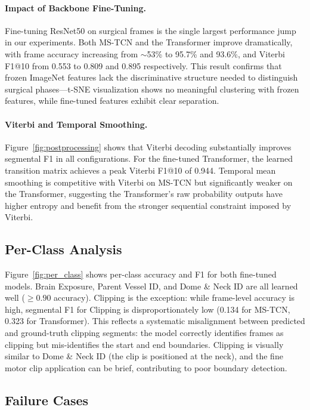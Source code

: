 \documentclass[10pt,twocolumn]{article}
\begin{document}
\paragraph{Impact of Backbone Fine-Tuning.} Fine-tuning ResNet50 on surgical frames is the single largest performance jump in our experiments. Both MS-TCN and the Transformer improve dramatically, with frame accuracy increasing from $\sim$53\% to 95.7\% and 93.6\%, and Viterbi F1@10 from 0.553 to 0.809 and 0.895 respectively. This result confirms that frozen ImageNet features lack the discriminative structure needed to distinguish surgical phases—t-SNE visualization shows no meaningful clustering with frozen features, while fine-tuned features exhibit clear separation.

\paragraph{Viterbi and Temporal Smoothing.} Figure~\ref{fig:postprocessing} shows that Viterbi decoding substantially improves segmental F1 in all configurations. For the fine-tuned Transformer, the learned transition matrix achieves a peak Viterbi F1@10 of 0.944. Temporal mean smoothing is competitive with Viterbi on MS-TCN but significantly weaker on the Transformer, suggesting the Transformer's raw probability outputs have higher entropy and benefit from the stronger sequential constraint imposed by Viterbi.

\subsection{Per-Class Analysis}

Figure~\ref{fig:per_class} shows per-class accuracy and F1 for both fine-tuned models. Brain Exposure, Parent Vessel ID, and Dome \& Neck ID are all learned well ($\geq 0.90$ accuracy). Clipping is the exception: while frame-level accuracy is high, segmental F1 for Clipping is disproportionately low (0.134 for MS-TCN, 0.323 for Transformer). This reflects a systematic misalignment between predicted and ground-truth clipping segments: the model correctly identifies frames as clipping but mis-identifies the start and end boundaries. Clipping is visually similar to Dome \& Neck ID (the clip is positioned at the neck), and the fine motor clip application can be brief, contributing to poor boundary detection.

\subsection{Failure Cases}
\end{document}
